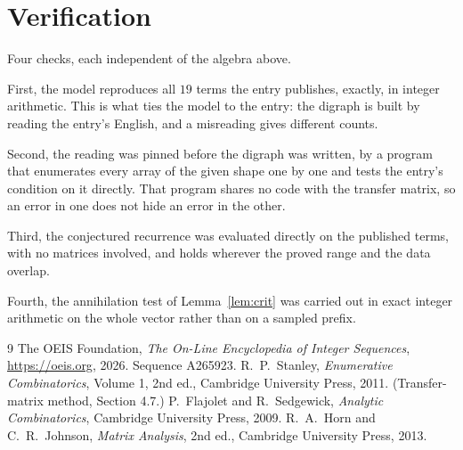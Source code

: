 \documentclass[11pt,a4paper]{article}
\theoremstyle{plain}
\theoremstyle{definition}
\begin{document}
\section{Verification}

Four checks, each independent of the algebra above.

First, the model reproduces all $19$ terms the entry publishes, exactly, in integer
arithmetic. This is what ties the model to the entry: the digraph is built by reading the
entry's English, and a misreading gives different counts.

Second, the reading was pinned before the digraph was written, by a program that enumerates
every array of the given shape one by one and tests the entry's condition on it directly. That program shares no code with the transfer matrix, so an error in one does not
hide an error in the other.

Third, the conjectured recurrence was evaluated directly on the published terms, with no
matrices involved, and holds wherever the proved range and the data overlap.

Fourth, the annihilation test of Lemma~\ref{lem:crit} was carried out in exact integer
arithmetic on the whole vector rather than on a sampled prefix.

\begin{thebibliography}{9}
 The OEIS Foundation, \emph{The On-Line Encyclopedia of Integer
Sequences}, \url{https://oeis.org}, 2026. Sequence A265923.
 R.~P.~Stanley, \emph{Enumerative Combinatorics}, Volume 1, 2nd ed.,
Cambridge University Press, 2011. (Transfer-matrix method, Section 4.7.)
 P.~Flajolet and R.~Sedgewick, \emph{Analytic Combinatorics}, Cambridge
University Press, 2009.
 R.~A.~Horn and C.~R.~Johnson, \emph{Matrix Analysis}, 2nd ed., Cambridge
University Press, 2013.
\end{thebibliography}
\end{document}
